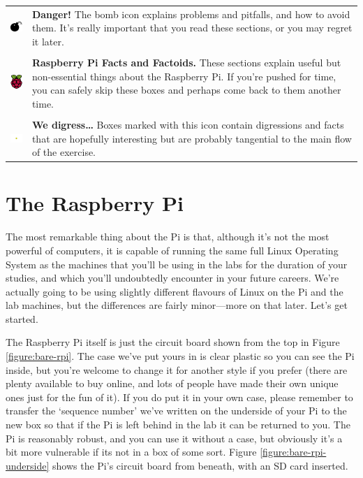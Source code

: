 \begin{tabular}{m{1.5cm}m{12cm}}
{\includegraphics[width=1.5cm]{images/bomb}} & \textbf{Danger!} The bomb icon explains problems and pitfalls, and how to avoid them. It's really important that you read these sections, or you may regret it later.\\
\\
\includegraphics[width=1.5cm]{images/rpi-logo} & \textbf{Raspberry Pi Facts and Factoids.} These sections explain useful but non-essential things about the Raspberry Pi. If you're pushed for time, you can safely skip these boxes and perhaps come back to them another time.\\
\\
\includegraphics[width=1.5cm]{images/diversion} & \textbf{We digress\ldots} Boxes marked with this icon contain digressions and facts that are hopefully interesting but are probably tangential to the main flow of the exercise.\\
\end{tabular}

\FloatBarrier 
\section{The Raspberry Pi}

The most remarkable thing about the Pi is that, although it's not the most powerful of computers, it is capable of running the same full Linux Operating System as the machines that you'll be using in the labs for the duration of your studies, and which you'll undoubtedly encounter in your future careers. We're actually going to be using slightly different flavours of Linux on the Pi and the lab machines, but the differences are fairly minor---more on that later. Let's get started. 

The Raspberry Pi itself is just the circuit board shown from the top in Figure \ref{figure:bare-rpi}. The case we've put yours in is clear plastic so you can see the Pi inside, but you're welcome to change it for another style if you prefer (there are plenty available to buy online, and lots of people have made their own unique ones just for the fun of it). If you do put it in your own case, please remember to transfer the `sequence number' we've written on the underside of your Pi to the new box so that if the Pi is left behind in the lab it can be returned to you. The Pi is reasonably robust, and you can use it without a case, but obviously it's a bit more vulnerable if its not in a box of some sort. Figure \ref{figure:bare-rpi-underside} shows the Pi's circuit board from beneath, with an SD card inserted.

